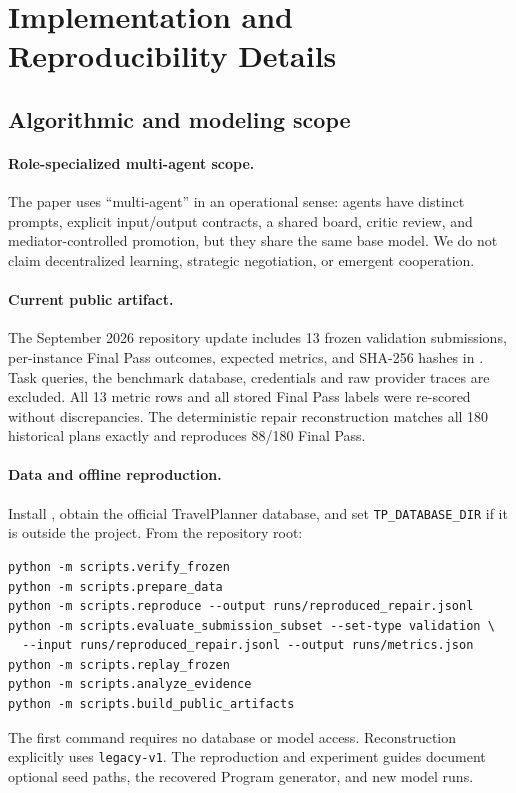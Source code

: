 \documentclass{article}
\begin{document}
\section{Implementation and Reproducibility Details}
\subsection{Algorithmic and modeling scope}
\paragraph{Role-specialized multi-agent scope.}
The paper uses ``multi-agent'' in an operational sense: agents have distinct prompts, explicit input/output contracts, a shared board, critic review, and mediator-controlled promotion, but they share the same base model. We do not claim decentralized learning, strategic negotiation, or emergent cooperation.

\paragraph{Current public artifact.}
The September 2026 repository update includes 13 frozen validation submissions,
per-instance Final Pass outcomes, expected metrics, and SHA-256 hashes in
. Task queries, the benchmark database, credentials and raw
provider traces are excluded. All 13 metric rows and all stored Final Pass labels
were re-scored without discrepancies. The deterministic repair reconstruction
matches all 180 historical plans exactly and reproduces 88/180 Final Pass.

\paragraph{Data and offline reproduction.}
Install , obtain the official TravelPlanner database,
and set \texttt{TP\_DATABASE\_DIR} if it is outside the project. From the repository root:
\begin{verbatim}
python -m scripts.verify_frozen
python -m scripts.prepare_data
python -m scripts.reproduce --output runs/reproduced_repair.jsonl
python -m scripts.evaluate_submission_subset --set-type validation \
  --input runs/reproduced_repair.jsonl --output runs/metrics.json
python -m scripts.replay_frozen
python -m scripts.analyze_evidence
python -m scripts.build_public_artifacts
\end{verbatim}
The first command requires no database or model access. Reconstruction explicitly
uses \texttt{legacy-v1}. The reproduction and experiment guides document optional
seed paths, the recovered Program generator, and new model runs.
\end{document}
